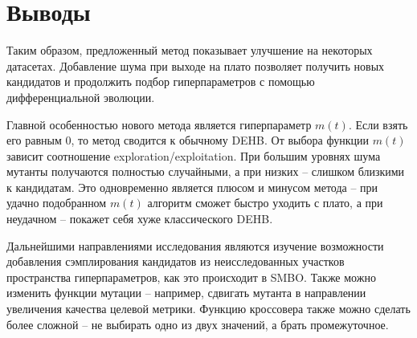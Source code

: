 \documentclass{article}
\begin{document}
\section{Выводы}
Таким образом, предложенный метод показывает улучшение на некоторых датасетах. Добавление шума при выходе на плато позволяет получить новых кандидатов и продолжить подбор гиперпараметров с помощью дифференциальной эволюции.

Главной особенностью нового метода является гиперпараметр $m(t)$. Если взять его равным 0, то метод сводится к обычному DEHB. От выбора функции $m(t)$ зависит соотношение exploration/exploitation. При большим уровнях шума мутанты получаются полностью случайными, а при низких -- слишком близкими к кандидатам. Это одновременно является плюсом и минусом метода -- при удачно подобранном $m(t)$ алгоритм сможет быстро уходить с плато, а при неудачном -- покажет себя хуже классического DEHB.

Дальнейшими направлениями исследования являются изучение возможности добавления сэмплирования кандидатов из неисследованных участков пространства гиперпараметров, как это происходит в SMBO. Также можно изменить функции мутации -- например, сдвигать мутанта в направлении увеличения качества целевой метрики. Функцию кроссовера также можно сделать более сложной -- не выбирать одно из двух значений, а брать промежуточное.

\newpage



\end{document}

